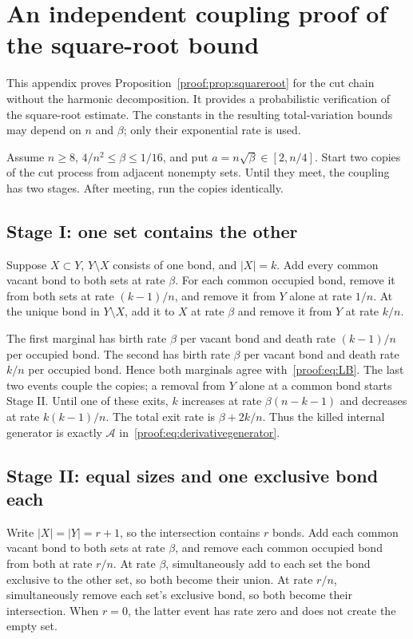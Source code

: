 \section{An independent coupling proof of the square-root bound}
\label{proof:app:coupling}

This appendix proves Proposition~\ref{proof:prop:squareroot} for the
cut chain without the harmonic decomposition. It provides a
probabilistic verification of the square-root estimate. The constants
in the resulting total-variation bounds may depend on $n$ and
$\beta$; only their exponential rate is used.

Assume $n\geq8$, $4/n^2\leq\beta\leq1/16$, and put
$a=n\sqrt\beta\in[2,n/4]$. Start two copies of the cut process from
adjacent nonempty sets. Until they meet, the coupling has two stages.
After meeting, run the copies identically.

\subsection*{Stage I: one set contains the other}
Suppose $X\subset Y$, $Y\setminus X$ consists of one bond, and
$|X|=k$. Add every common vacant bond to both sets at rate $\beta$.
For each common occupied bond, remove it from both sets at rate
$(k-1)/n$, and remove it from $Y$ alone at rate $1/n$. At the unique
bond in $Y\setminus X$, add it to $X$ at rate $\beta$ and remove it
from $Y$ at rate $k/n$.

The first marginal has birth rate $\beta$ per vacant bond and death
rate $(k-1)/n$ per occupied bond. The second has birth rate $\beta$
per vacant bond and death rate $k/n$ per occupied bond. Hence both
marginals agree with~\eqref{proof:eq:LB}. The last two events couple
the copies; a removal from $Y$ alone at a common bond starts
Stage II. Until one of these exits, $k$ increases at rate
$\beta(n-k-1)$ and decreases at rate $k(k-1)/n$. The total exit rate
is $\beta+2k/n$. Thus the killed internal generator is exactly
$\mathcal A$ in~\eqref{proof:eq:derivativegenerator}.

\subsection*{Stage II: equal sizes and one exclusive bond each}
Write $|X|=|Y|=r+1$, so the intersection contains $r$ bonds. Add
each common vacant bond to both sets at rate $\beta$, and remove
each common occupied bond from both at rate $r/n$. At rate
$\beta$, simultaneously add to each set the bond exclusive to the
other set, so both become their union. At rate $r/n$,
simultaneously remove each set's exclusive bond, so both become
their intersection. When $r=0$, the latter event has rate zero and
does not create the empty set.

